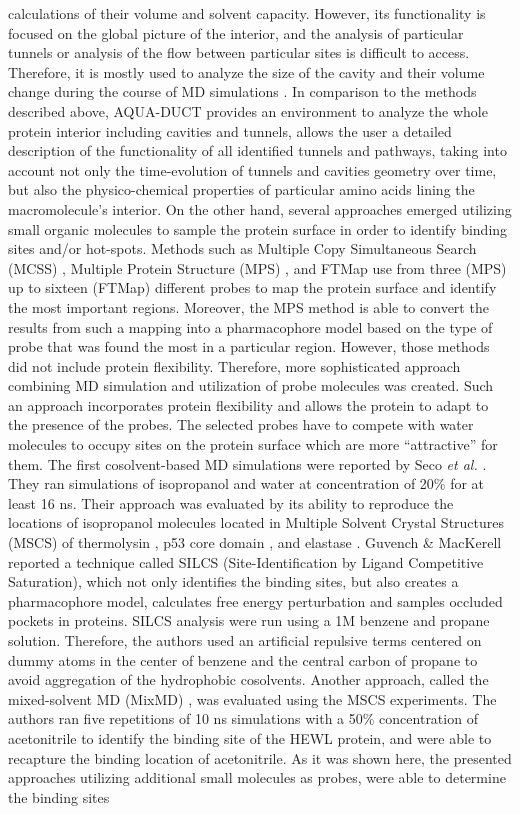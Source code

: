 \documentclass[9pt,tutorial, pubversion]{livecoms}
\begin{document}
calculations of their volume and solvent capacity. However, its functionality is focused on the global picture of the interior, and the analysis of particular tunnels or analysis of the flow between particular sites is difficult to access. Therefore, it is mostly used to analyze the size of the cavity and their volume change during the course of MD simulations \cite{Mitusinska2020}.
In comparison to the methods described above, AQUA-DUCT provides an environment to analyze the whole protein interior including cavities and tunnels, allows the user a detailed description of the functionality of all identified tunnels and pathways, taking into account not only the time-evolution of tunnels and cavities geometry over time, but also the physico-chemical properties of particular amino acids lining the macromolecule's interior.
On the other hand, several approaches emerged utilizing small organic molecules to sample the protein surface in order to identify binding sites and/or hot-spots. Methods such as Multiple Copy Simultaneous Search (MCSS) \cite{Miranker1991}, Multiple Protein Structure (MPS) \cite{Carlson1999,Lerner2008}, and  FTMap \cite{Brenke2009} use from three (MPS) up to sixteen (FTMap) different probes to map the protein surface and identify the most important regions. Moreover, the MPS method is able to convert the results from such a mapping into a pharmacophore model based on the type of probe that was found the most in a particular region. However, those methods did not include protein flexibility. Therefore, more sophisticated approach combining MD simulation and utilization of probe molecules was created. Such an approach incorporates protein flexibility and allows the protein to adapt to the presence of the probes. The selected probes have to compete with water molecules to occupy sites on the protein surface which are more “attractive” for them. The first cosolvent-based MD simulations were reported by Seco \textit{et al.} \cite{Seco2009}. They ran simulations of isopropanol and water at concentration of 20\% for at least 16 ns. Their approach was evaluated by its ability to reproduce the locations of isopropanol molecules located in Multiple Solvent Crystal Structures (MSCS) of thermolysin \cite{English2001}, p53 core domain \cite{Ho2006}, and elastase \cite{Mattos2006}. Guvench \& MacKerell \cite{Guvench2009} reported a technique called SILCS (Site-Identification by Ligand Competitive Saturation), which not only identifies the binding sites, but also creates a pharmacophore model, calculates free energy perturbation and samples occluded pockets in proteins. SILCS analysis were run using a 1M benzene and propane solution. Therefore, the authors used an artificial repulsive terms centered on dummy atoms in the center of benzene and the central carbon of propane to avoid aggregation of the hydrophobic cosolvents. Another approach, called the mixed-solvent MD (MixMD) \cite{Lexa2011}, was evaluated using the MSCS experiments. The authors ran five repetitions of 10 ns simulations with a 50\% concentration of acetonitrile to identify the binding site of the HEWL protein, and were able to recapture the binding location of acetonitrile. As it was shown here, the presented approaches utilizing additional small molecules as probes, were able to determine the binding sites 
\end{document}
